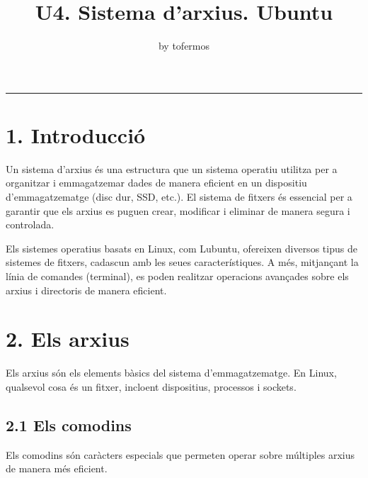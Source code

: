 \documentclass[
  12 pt,
  a4paper,
]{article}
\title{U4. Sistema d'arxius. Ubuntu}
\author{by tofermos}
\date{}
\begin{document}
\maketitle

{
\setcounter{tocdepth}{2}
\tableofcontents
}
\newpage
\renewcommand\tablename{Tabla}

\begin{center}\rule{0.5\linewidth}{0.5pt}\end{center}

\section{1. Introducció}\label{introducciuxf3}

Un sistema d'arxius és una estructura que un sistema operatiu utilitza
per a organitzar i emmagatzemar dades de manera eficient en un
dispositiu d'emmagatzematge (disc dur, SSD, etc.). El sistema de fitxers
és essencial per a garantir que els arxius es puguen crear, modificar i
eliminar de manera segura i controlada.

Els sistemes operatius basats en Linux, com Lubuntu, ofereixen diversos
tipus de sistemes de fitxers, cadascun amb les seues característiques. A
més, mitjançant la línia de comandes (terminal), es poden realitzar
operacions avançades sobre els arxius i directoris de manera eficient.

\section{2. Els arxius}\label{els-arxius}

Els arxius són els elements bàsics del sistema d'emmagatzematge. En
Linux, qualsevol cosa és un fitxer, incloent dispositius, processos i
sockets.

\subsection{2.1 Els comodins}\label{els-comodins}

Els comodins són caràcters especials que permeten operar sobre múltiples
arxius de manera més eficient.
\end{document}
